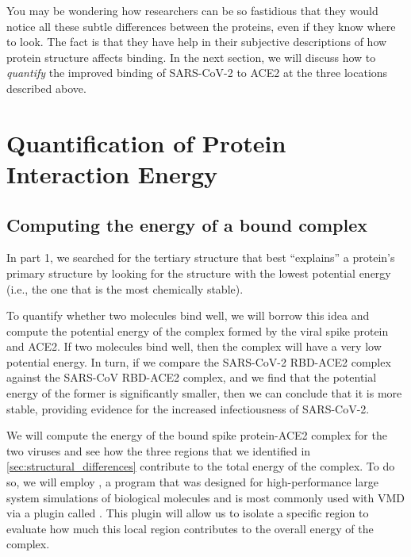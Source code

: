 You may be wondering how researchers can be so fastidious that they would notice all these subtle differences between the proteins, even if they know where to look. The fact is that they have help in their subjective descriptions of how protein structure affects binding. In the next section, we will discuss how to \textit{quantify} the improved binding of SARS-CoV-2 to ACE2 at the three locations described above.\\

\FloatBarrier
{}

\section{Quantification of Protein Interaction Energy}
\label{sec:interaction_energy}
\subsection{Computing the energy of a bound complex}

In part 1, we searched for the tertiary structure that best ``explains'' a protein's primary structure by looking for the structure with the lowest potential energy (i.e., the one that is the most chemically stable).

To quantify whether two molecules bind well, we will borrow this idea and compute the potential energy of the complex formed by the viral spike protein and ACE2. If two molecules bind well, then the complex will have a very low potential energy. In turn, if we compare the SARS-CoV-2 RBD-ACE2 complex against the SARS-CoV RBD-ACE2 complex, and we find that the potential energy of the former is significantly smaller, then we can conclude that it is more stable, providing evidence for the increased infectiousness of SARS-CoV-2.

We will compute the energy of the bound spike protein-ACE2 complex for the two viruses and see how the three regions that we identified in \autoref{sec:structural_differences} contribute to the total energy of the complex. To do so, we will employ \href{https://bit.ly/3uNv9gf}{}, a program that was designed for high-performance large system simulations of biological molecules and is most commonly used with VMD via a plugin called \href{https://bit.ly/367IOUZ}{}. This plugin will allow us to isolate a specific region to evaluate how much this local region contributes to the overall energy of the complex. 

